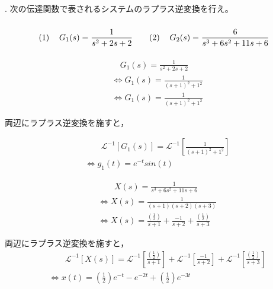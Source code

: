 \documentclass[a4paper,12pt]{article}
\begin{document}
\noindent
{}\\
\\
\\


. 次の伝達関数で表されるシステムのラプラス逆変換を行え。
\vspace{-4mm}
\[
\renewcommand{\arraystretch}{3.0} %
\begin{tabular}{@{}rl@{\quad\quad}rl@{}}
(1) & $G_1(s) = \dfrac{1}{s^2+2s+2}$                 & (2) & $G_2(s) = \dfrac{6}{s^3+6s^2+11s+6}$ \\
\end{tabular}
\]

\begin{tcolorbox}[title={1. (1) \(G_1(s) = \dfrac{1}{s^2+2s+2}\) }]
  \vspace{-3mm}
    \begin{align*}
    &\quad G_1(s) =\frac{ 1 }{ s^2 + 2s + 2}  \\
    &\Leftrightarrow G_1(s) =\frac{ 1 }{ ( s + 1 )^2+ 1^2} \\
    &\Leftrightarrow G_1(s) 
    = \frac{ 1}{ ( s + 1 )^2+ 1^2}
\end{align*}

\quad 両辺にラプラス逆変換を施すと，

\vspace{-3mm}
\begin{align*}
    &\qquad \mathcal{L}^{-1} \left[ G_1(s) \right] 
    =\mathcal{L}^{-1} \left[ \frac{ 1 }{ ( s + 1 )^2+ 1^2} \right]\\
    &\Leftrightarrow g_1(t) = e^{-t} sin(t)
\end{align*}
\end{tcolorbox}

\begin{tcolorbox}[title={1. (2) \(G_2(s) = \dfrac{6}{s^3+6s^2+11s+6}\) }]
  \vspace{-3mm}
\begin{align*}
    &\qquad X(s) =\frac{ 1 }{ s^3 +6 s^2+ 11s + 6 }  \\
    &\Leftrightarrow X(s) =\frac{ 1 }{ (s+1)(s+2)(s+3) }  \\
    &\Leftrightarrow X(s) 
    = \frac{(\frac{1}{2})}{s+1}
    + \frac{-1}{s + 2}
    + \frac{(\frac{1}{2})}{s + 3}
\end{align*}

\quad 両辺にラプラス逆変換を施すと，
\vspace{-3mm}
\begin{align*}
    &\qquad \mathcal{L}^{-1} \left[ X(s) \right] 
    =\mathcal{L}^{-1} \left[ \frac{(\frac{1}{2})}{s+1} \right]
    +\mathcal{L}^{-1} \left[ \frac{-1}{s + 2} \right]
    +\mathcal{L}^{-1} \left[ \frac{(\frac{1}{2})}{s + 3} \right] \\
    &\Leftrightarrow x(t) = (\frac{1}{2})e^{-t} - e^{-2t} + (\frac{1}{2})e^{-3t}
\end{align*}
\end{tcolorbox}
\end{document}
